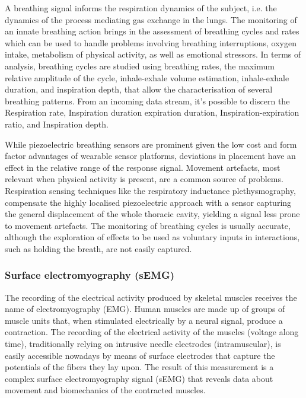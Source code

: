 A breathing signal informs the respiration dynamics of the subject, i.e. the dynamics of the process mediating gas exchange in the lungs. The monitoring of an innate breathing action brings in the assessment of breathing cycles and rates which can be used to handle problems involving breathing interruptions, oxygen intake, metabolism of physical activity, as well as emotional stressors. In terms of analysis, breathing cycles are studied using breathing rates, the maximum relative amplitude of the cycle, inhale-exhale volume estimation, inhale-exhale duration, and inspiration depth, that allow the characterisation of several breathing patterns. From an incoming data stream, it's possible to discern the Respiration rate, Inspiration duration expiration duration, Inspiration-expiration ratio, and Inspiration depth.

While piezoelectric breathing sensors are prominent given the low cost and form factor advantages of wearable sensor platforms, deviations in placement have an effect in the relative range of the response signal. Movement artefacts, most relevant when physical activity is present, are a common source of problems. Respiration sensing techniques like the respiratory inductance plethysmography, compensate the highly localised piezoelectric approach with a sensor capturing the general displacement of the whole thoracic cavity, yielding a signal less prone to movement artefacts. The monitoring of breathing cycles is usually accurate, although the exploration of effects to be used as voluntary inputs in interactions, such as holding the breath, are not easily captured. 

\subsubsection{Surface electromyography (sEMG)}
The recording of the electrical activity produced by skeletal muscles receives the name of electromyography (EMG). Human muscles are made up of groups of muscle units that, when stimulated electrically by a neural signal, produce a contraction. The recording of the electrical activity of the muscles (voltage along time), traditionally relying on intrusive needle electrodes (intramuscular), is easily accessible nowadays by means of surface electrodes that capture the potentials of the fibers they lay upon. The result of this measurement is a complex surface electromyography signal (sEMG) that reveals data about movement and biomechanics of the contracted muscles.

